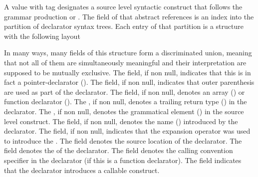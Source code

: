 A  value with tag  designates a source level syntactic construct that
follows the grammar production  or .
The  field of that abstract references is an index into the partition of declarator syntax trees.
Each entry of that partition is a structure with the following layout
%
\begin{figure}[H]
	\centering
	\label{fig:ifc:SyntaxSort:Declarator}
\end{figure}
%
In many ways, many fields of this structure form a discriminated union, meaning that not all of them are simultaneously meaningful and their interpretation are supposed to be mutually exclusive.
The  field, if non null, indicates that this is in fact a pointer-declarator ().
The  field, if non null, indicates that outer parenthesis are used as part of the declarator.
The  field, if non null, denotes an array () or function declarator ().
The , if non null, denotes a trailing return type () in the declarator.
The , if non null, denotes the  grammatical element () in the source level construct.
The  field, if non null, denotes the name () introduced by the declarator.
The  field, if non null, indicates that the expansion operator  was used to introduce the .
The  field denotes the source location of the declarator.
The  field denotes the  of the declarator.
The  field denotes the calling convention specifier in the declarator (if this is a function declarator).
The  field indicates that the declarator introduces a callable construct.


